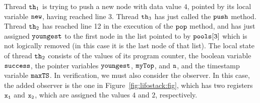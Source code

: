 Thread ${\tt th}_1$ is trying to push a new node with data value $4$, pointed by its local variable $\tt new$, having reached line 3.
Thread ${\tt th}_3$ has just called the ${\tt push}$ method.
Thread ${\tt th}_2$ has reached line 12 in the execution of the ${\tt pop}$ method,  and has just assigned ${\tt youngest}$ to the first node in the list
pointed to by $\tt pools[3]$ which is not logically removed (in this case it is the last node of that list).
The local state of thread ${\tt th}_2$
consists of the values of its program counter, the boolean variable ${\tt success}$, the pointer variables ${\tt youngest}$, ${\tt myTop}$, and ${\tt n}$,
and the timestamp variable ${\tt maxTS}$.
In verification, we must also consider the observer. In this case, the added
observer is the one in Figure~\ref{fig:lifostack:fig}, which has two registers
$\tt x_1$ and $\tt x_2$, which are assigned the values $4$ and $2$,
respectively.




%	


